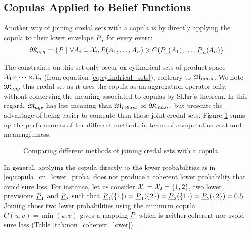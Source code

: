\subsection{Copulas Applied to Belief Functions}\label{sec:aggregation_method}
Another way of joining credal sets with a copula is by directly applying the copula to their lower envelope ${\underline{P}}_i$ for every event:
\begin{eqnarray}\label{eq:copula_on_lower_proba}
    {\mathfrak{M}}_{agg} = \{P~|~\forall A_i\subseteq{\mathcal{X}}_i, P(A_1,\dots, A_n)\geqslant C({\underline{P}}_1(A_1), \dots, {\underline{P}}_n(A_n)\}
\end{eqnarray}

The constraints on this set only occur on cylindrical sets of product space ${\mathcal{X}}_1{\times\dots\times} {\mathcal{X}}_n$ (from equation \ref{eq:cylindrical_sets}), contrary to ${\mathfrak{M}}_{mass}$. We note ${\mathfrak{M}}_{agg}$ this credal set as it uses the copula as an aggregation operator only, without conserving the meaning associated to copulas by Sklar's theorem. In this regard, ${\mathfrak{M}}_{agg}$ has less meaning than ${\mathfrak{M}}_{robust}$ or ${\mathfrak{M}}_{mass}$, but presents the advantage of being easier to compute than those joint credal sets. Figure \ref{fig:meaning_computation} sums up the performances of the different methods in terms of computation cost and meaningfulness.

\begin{figure}[!hb]
    \centering
    \caption{Comparing different methods of joining credal sets with a copula.}
    \label{fig:meaning_computation}
\end{figure}

In general, applying the copula directly to the lower probabilities as in \eqref{eq:copula_on_lower_proba} does not produce a coherent lower probability that avoid sure loss. For instance, let us consider ${\mathcal{X}}_1 = {\mathcal{X}}_2 = \{1, 2\}$, two lower previsions ${\underline{P}}_1$ and ${\underline{P}}_2$ such that ${\underline{P}}_1(\{1\}) = {\underline{P}}_1(\{2\}) = {\underline{P}}_2(\{1\}) = {\underline{P}}_2(\{2\}) = 0.5$. Joining those two lower probabilities using the minimum copula $C(u,v)=\min(u,v)$ gives a mapping ${\underline{P}}$ which is neither coherent nor avoid sure loss (Table \ref{tab:non_coherent_lower}).

